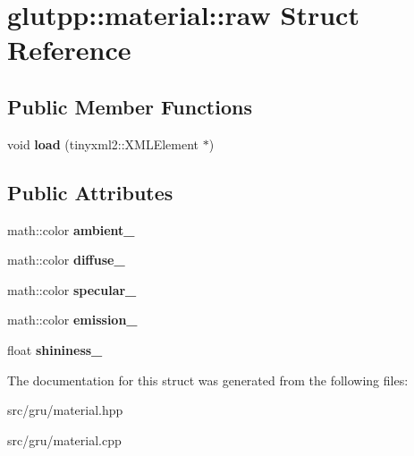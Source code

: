 \hypertarget{structglutpp_1_1material_1_1raw}{\section{glutpp\-:\-:material\-:\-:raw \-Struct \-Reference}
\label{structglutpp_1_1material_1_1raw}
}
\subsection*{\-Public \-Member \-Functions}
\begin{DoxyCompactItemize}
\item 
\hypertarget{structglutpp_1_1material_1_1raw_acf689c9d6f960423b18174104d1c7c1a}{void {\bfseries load} (tinyxml2\-::\-X\-M\-L\-Element $\ast$)}\label{structglutpp_1_1material_1_1raw_acf689c9d6f960423b18174104d1c7c1a}

\end{DoxyCompactItemize}
\subsection*{\-Public \-Attributes}
\begin{DoxyCompactItemize}
\item 
\hypertarget{structglutpp_1_1material_1_1raw_a9414ed79262966e74d9b0542c7282810}{math\-::color {\bfseries ambient\-\_\-}}\label{structglutpp_1_1material_1_1raw_a9414ed79262966e74d9b0542c7282810}

\item 
\hypertarget{structglutpp_1_1material_1_1raw_ae3b4e669aca69fd2cfbc0fed91351d0a}{math\-::color {\bfseries diffuse\-\_\-}}\label{structglutpp_1_1material_1_1raw_ae3b4e669aca69fd2cfbc0fed91351d0a}

\item 
\hypertarget{structglutpp_1_1material_1_1raw_a70c6bf0e1ca4dc01dd135e0b34a27595}{math\-::color {\bfseries specular\-\_\-}}\label{structglutpp_1_1material_1_1raw_a70c6bf0e1ca4dc01dd135e0b34a27595}

\item 
\hypertarget{structglutpp_1_1material_1_1raw_a8ba7758edaa29a6311a72babb3544754}{math\-::color {\bfseries emission\-\_\-}}\label{structglutpp_1_1material_1_1raw_a8ba7758edaa29a6311a72babb3544754}

\item 
\hypertarget{structglutpp_1_1material_1_1raw_a002a3524745e18b298dbb995cc83c19e}{float {\bfseries shininess\-\_\-}}\label{structglutpp_1_1material_1_1raw_a002a3524745e18b298dbb995cc83c19e}

\end{DoxyCompactItemize}


\-The documentation for this struct was generated from the following files\-:\begin{DoxyCompactItemize}
\item 
src/gru/material.\-hpp\item 
src/gru/material.\-cpp\end{DoxyCompactItemize}
